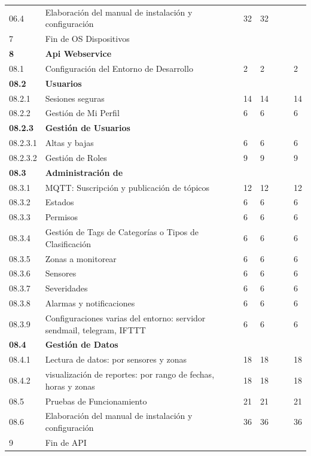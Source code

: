 \documentclass[11pt]{charter}
\begin{document}
\begin{landscape}
\begin{tabularx}{\linewidth}{@{}|p{1.5cm}|p{13cm}|p{1.5cm}|p{1.5cm}|p{1.5cm}|p{1.5cm}|p{1.5cm}|@{}}
06.4 & Elaboración del manual de instalación y   configuración & 32 & 32 &  &  &  \\
7 & Fin de OS Dispositivos &  &  &  &  &  \\
\textbf{8} & \textbf{Api Webservice} &  &  &  &  &  \\
08.1 & Configuración del Entorno de Desarrollo & 2 & 2 &  &  & 2 \\
\textbf{08.2} & \textbf{Usuarios} &  &  &  &  &  \\
08.2.1 & Sesiones seguras & 14 & 14 &  &  & 14 \\
08.2.2 & Gestión de Mi Perfil & 6 & 6 &  &  & 6 \\
\textbf{08.2.3} & \textbf{Gestión de Usuarios} &  &  &  &  &  \\
08.2.3.1 & Altas y bajas & 6 & 6 &  &  & 6 \\
08.2.3.2 & Gestión de Roles & 9 & 9 &  &  & 9 \\
\textbf{08.3} & \textbf{Administración de} &  &  &  &  &  \\
08.3.1 & MQTT: Suscripción y   publicación de tópicos & 12 & 12 &  &  & 12 \\
08.3.2 & Estados & 6 & 6 &  &  & 6 \\
08.3.3 & Permisos & 6 & 6 &  &  & 6 \\
08.3.4 & Gestión de Tags de Categorías   o Tipos de Clasificación & 6 & 6 &  &  & 6 \\
08.3.5 & Zonas a monitorear & 6 & 6 &  &  & 6 \\
08.3.6 & Sensores & 6 & 6 &  &  & 6 \\
08.3.7 & Severidades & 6 & 6 &  &  & 6 \\
08.3.8 & Alarmas y notificaciones & 6 & 6 &  &  & 6 \\
08.3.9 & Configuraciones varias del   entorno: servidor sendmail, telegram, IFTTT & 6 & 6 &  &  & 6 \\
\textbf{08.4} & \textbf{Gestión de Datos} &  &  &  &  &  \\
08.4.1 & Lectura de datos: por   sensores y zonas & 18 & 18 &  &  & 18 \\
08.4.2 & visualización de reportes:   por rango de fechas, horas y zonas & 18 & 18 &  &  & 18 \\
08.5 & Pruebas de Funcionamiento & 21 & 21 &  &  & 21 \\
08.6 & Elaboración del manual de instalación y   configuración & 36 & 36 &  &  & 36 \\
9 & Fin de API &  &  &  &  &  \\

\end{tabularx}
\end{landscape}
\end{document}
